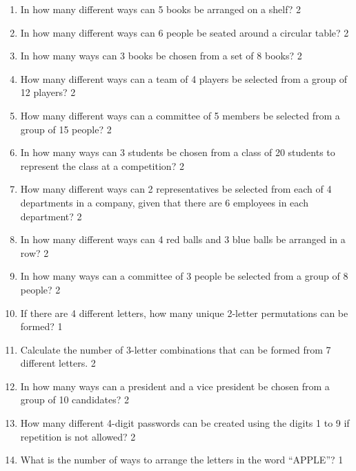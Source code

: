 \documentclass[a4paper,oneside]{book}
\begin{document}
\begin{enumerate}
\item In how many different ways can 5 books be arranged on a shelf? \hfill 2

\item
In how many different ways can 6 people be seated around a circular table? \hfill 2

\item
In how many ways can 3 books be chosen from a set of 8 books? \hfill 2

\item
How many different ways can a team of 4 players be selected from a group of 12 players? \hfill 2

\item
How many different ways can a committee of 5 members be selected from a group of 15 people? \hfill 2

\item
In how many ways can 3 students be chosen from a class of 20 students to represent the class at a competition? \hfill 2

\item
How many different ways can 2 representatives be selected from each of 4 departments in a company, given that there are 6 employees in each department? \hfill 2


\item
In how many different ways can 4 red balls and 3 blue balls be arranged in a row? \hfill 2


\item In how many ways can a committee of 3 people be selected from a group of 8 people? \hfill 2

\item If there are 4 different letters, how many unique 2-letter permutations can be formed? \hfill 1

\item Calculate the number of 3-letter combinations that can be formed from 7 different letters. \hfill 2

\item In how many ways can a president and a vice president be chosen from a group of 10 candidates? \hfill 2

\item How many different 4-digit passwords can be created using the digits 1 to 9 if repetition is not allowed? \hfill 2

\item What is the number of ways to arrange the letters in the word “APPLE”? \hfill 1


\end{enumerate}
\end{document}
